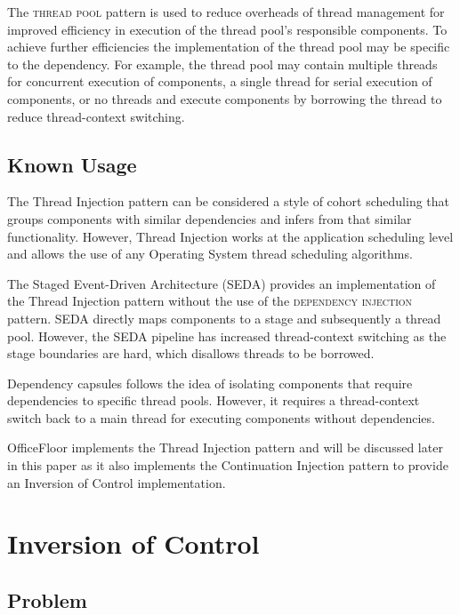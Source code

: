 \documentclass[prodmode]{style/acmlarge}
\begin{document}
The \textsc{thread pool} pattern \cite{thread-per-request} is used to reduce
overheads of thread management for improved efficiency in execution of the
thread pool's responsible components.  To achieve further efficiencies the
implementation of the thread pool may be specific to the dependency.  For
example, the thread pool may contain multiple threads for concurrent execution
of components, a single thread for serial execution of components, or no
threads and execute components by borrowing the thread to reduce thread-context
switching.


\subsection{Known Usage}

The Thread Injection pattern can be considered a style of cohort scheduling
\cite{cohort} that groups components with similar dependencies and infers from
that similar functionality.  However, Thread Injection works at the application
scheduling level and allows the use of any Operating System thread scheduling
algorithms.

The Staged Event-Driven Architecture (SEDA) \cite{seda} provides an
implementation of the Thread Injection pattern without the use of the
\textsc{dependency injection} pattern.  SEDA directly maps components to a stage
and subsequently a thread pool.  However, the SEDA pipeline has increased
thread-context switching as the stage boundaries are hard, which disallows
threads to be borrowed.

Dependency capsules \cite{dependency-capsules} follows the idea of isolating
components that require dependencies to specific thread pools.  However, it
requires a thread-context switch back to a main thread for executing components
without dependencies.

OfficeFloor \cite{officefloor} implements the Thread Injection pattern and will
be discussed later in this paper as it also implements the Continuation
Injection pattern to provide an Inversion of Control implementation.



\section{Inversion of Control}


\subsection{Problem}
\end{document}
